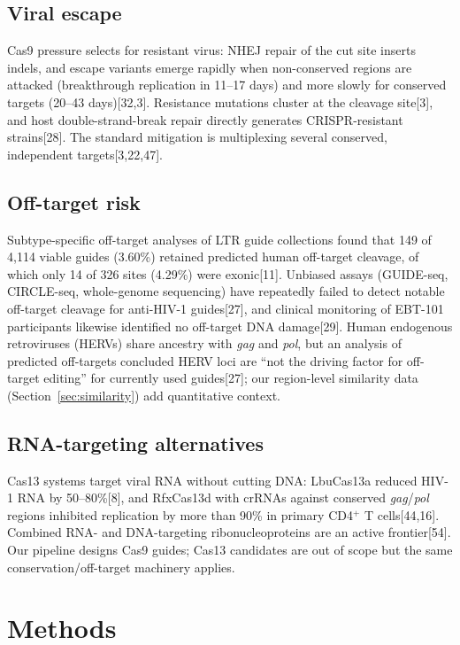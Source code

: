 \documentclass[11pt]{article}
\newcommand{\src}[1]{[#1]}
\newcommand{\HH}{HIV-1}
\begin{document}
\subsection{Viral escape}
Cas9 pressure selects for resistant virus: NHEJ repair of the cut site
inserts indels, and escape variants emerge rapidly when non-conserved
regions are attacked (breakthrough replication in 11--17 days) and more
slowly for conserved targets (20--43 days)\src{32,3}. Resistance mutations
cluster at the cleavage site\src{3}, and host double-strand-break repair
directly generates CRISPR-resistant strains\src{28}. The standard
mitigation is multiplexing several conserved, independent targets\src{3,22,47}.

\subsection{Off-target risk}
Subtype-specific off-target analyses of LTR guide collections found that
149 of 4,114 viable guides (3.60\%) retained predicted human off-target
cleavage, of which only 14 of 326 sites (4.29\%) were exonic\src{11}.
Unbiased assays (GUIDE-seq, CIRCLE-seq, whole-genome sequencing) have
repeatedly failed to detect notable off-target cleavage for anti-\HH{}
guides\src{27}, and clinical monitoring of EBT-101 participants likewise
identified no off-target DNA damage\src{29}. Human endogenous retroviruses
(HERVs) share ancestry with \emph{gag} and \emph{pol}, but an analysis of
predicted off-targets concluded HERV loci are ``not the driving factor for
off-target editing'' for currently used guides\src{27}; our region-level
similarity data (Section~\ref{sec:similarity}) add quantitative context.

\subsection{RNA-targeting alternatives}
Cas13 systems target viral RNA without cutting DNA: LbuCas13a reduced \HH{}
RNA by 50--80\%\src{8}, and RfxCas13d with crRNAs against conserved
\emph{gag}/\emph{pol} regions inhibited replication by more than 90\% in
primary CD4$^+$ T cells\src{44,16}. Combined RNA- and DNA-targeting
ribonucleoproteins are an active frontier\src{54}. Our pipeline designs
Cas9 guides; Cas13 candidates are out of scope but the same
conservation/off-target machinery applies.

\section{Methods}
\end{document}
